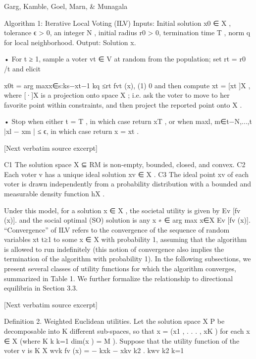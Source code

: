 \documentclass[10pt]{article}
\begin{document}
\begin{ReviewVerbatim}
                          Garg, Kamble, Goel, Marn, & Munagala


 Algorithm 1: Iterative Local Voting (ILV)
  Inputs: Initial solution x0 ∈ X , tolerance ϵ > 0, an integer N , initial radius r0 > 0,
    termination time T , norm q for local neighborhood.
   Output:     Solution x.

       • For t ≥ 1, sample a voter vt ∈ V at random from the population; set rt = r0 /t
           and elicit


                             x0t = arg maxx∈{s:ks−xt−1 kq ≤rt } fvt (x),             (1)
                                         0
           and then compute xt = [xt ]X , where [·]X is a projection onto space X ; i.e. ask
           the voter to move to her favorite point within constraints, and then project the
           reported point onto X .


       • Stop when either t = T , in which case return xT , or when
         maxl, m∈{t−N,...,t} |xl − xm | ≤ ϵ, in which case return x = xt .

[Next verbatim source excerpt]

 C1 The solution space X ⊆ RM is non-empty, bounded, closed, and convex.
 C2 Each voter v has a unique ideal solution xv ∈ X .
 C3 The ideal point xv of each voter is drawn independently from a probability distribution
      with a bounded and measurable density function hX .


Under this model, for a solution x ∈ X , the societal utility is given by Ev [fv (x)]. and the
social optimal (SO) solution is any x
                                         ∗ ∈ arg max
                                                    x∈X Ev [fv (x)].
   “Convergence” of    ILV refers to the convergence of the sequence of random variables
{xt }t≥1 to some x ∈ X with probability 1, assuming that the algorithm is allowed to run
indefinitely (this notion of convergence also implies the termination of the algorithm with
probability 1).
   In the following subsections, we present several classes of utility functions for which
the algorithm converges, summarized in Table 1. We further formalize the relationship to
directional equilibria in Section 3.3.

[Next verbatim source excerpt]

Definition 2. Weighted Euclidean utilities. Let the solution space X P           be decomposable
into K different sub-spaces, so that x = (x1 , . . . , xK ) for each x ∈ X (where K         k
                                                                                  k=1 dim(x ) =
M ). Suppose that the utility function of the voter v is
                                         K
                                         X  wvk
                              fv (x) = −          kxk − xkv k2 .
                                           kwv k2
                                         k=1


\end{ReviewVerbatim}
\end{document}
